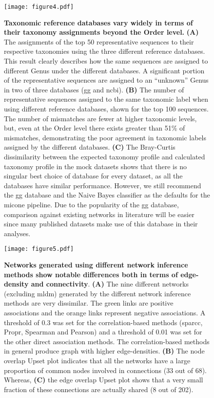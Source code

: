   \begin{figure}[H]
    \centering
    \texttt{[image: figure4.pdf]}
  \end{figure}
  \begin{figure}[H]
    \centering
    \caption{
      \textbf{Taxonomic reference databases vary widely in terms of their taxonomy assignments beyond the Order level.}
      \textbf{(A)} The assignments of the top 50 representative sequences to their respective taxonomies using the three different reference databases.
      This result clearly describes how the same sequences are assigned to different Genus under the different databases.
      A significant portion of the representative sequences are assigned to an ``unknown'' Genus in two of three databases (\ac{gg} and \ac{ncbi}).
      \textbf{(B)} The number of representative sequences assigned to the same taxonomic label when using different reference databases, shown for the top 100 sequences.
      The number of mismatches are fewer at higher taxonomic levels, but, even at the Order level there exists greater than 51\% of mismatches, demonstrating the poor agreement in taxonomic labels assigned by the different databases.
      \textbf{(C)} The Bray-Curtis dissimilarity between the expected taxonomy profile and calculated taxonomy profile in the mock datasets shows that there is no singular best choice of database for every dataset, as all the databases have similar performance.
      However, we still recommend the \ac{gg} database and the Naive Bayes classifier as the defaults for the \ac{micone} pipeline.
      Due to the popularity of the \ac{gg} database, comparison against existing networks in literature will be easier since many published datasets make use of this database in their analyses.
    }
    \label{fig:figure4}
  \end{figure}
  \FloatBarrier
  \newpage


  \begin{figure}[H]
    \centering
    \texttt{[image: figure5.pdf]}
  \end{figure}
  \begin{figure}[H]
    \centering
    \caption{
      \textbf{Networks generated using different network inference methods show notable differences both in terms of edge-density and connectivity}.
      \textbf{(A)} The nine different networks (excluding \ac{mldm}) generated by the different network inference methods are very dissimilar.
      The green links are positive associations and the orange links represent negative associations.
      A threshold of 0.3 was set for the correlation-based methods (\ac{sparcc}, Propr, Spearman and Pearson) and a threshold of 0.01 was set for the other direct association methods.
      The correlation-based methods in general produce graph with higher edge-densities.
      \textbf{(B)} The node overlap Upset plot indicates that all the networks have a large proportion of common nodes involved in connections (33 out of 68).
      Whereas, \textbf{(C)} the edge overlap Upset plot shows that a very small fraction of these connections are actually shared (8 out of 202).
    }
    \label{fig:figure5}
  \end{figure}
  \FloatBarrier
  \newpage

